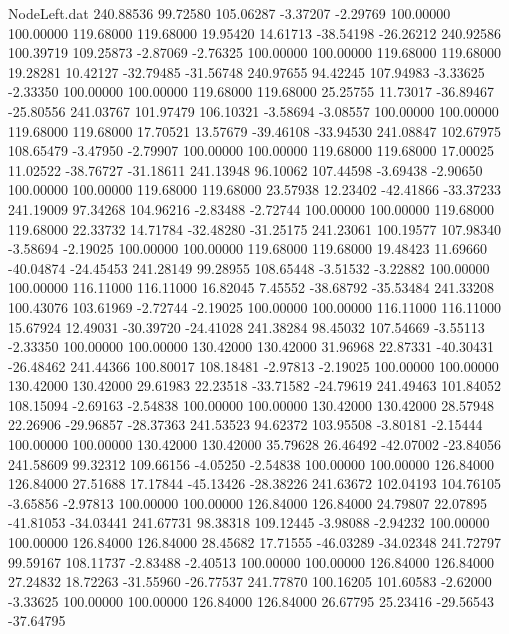 \begin{filecontents}{NodeLeft.dat}
 240.88536   99.72580  105.06287    -3.37207   -2.29769  100.00000  100.00000  119.68000  119.68000   19.95420   14.61713  -38.54198  -26.26212
 240.92586  100.39719  109.25873    -2.87069   -2.76325  100.00000  100.00000  119.68000  119.68000   19.28281   10.42127  -32.79485  -31.56748
 240.97655   94.42245  107.94983    -3.33625   -2.33350  100.00000  100.00000  119.68000  119.68000   25.25755   11.73017  -36.89467  -25.80556
 241.03767  101.97479  106.10321    -3.58694   -3.08557  100.00000  100.00000  119.68000  119.68000   17.70521   13.57679  -39.46108  -33.94530
 241.08847  102.67975  108.65479    -3.47950   -2.79907  100.00000  100.00000  119.68000  119.68000   17.00025   11.02522  -38.76727  -31.18611
 241.13948   96.10062  107.44598    -3.69438   -2.90650  100.00000  100.00000  119.68000  119.68000   23.57938   12.23402  -42.41866  -33.37233
 241.19009   97.34268  104.96216    -2.83488   -2.72744  100.00000  100.00000  119.68000  119.68000   22.33732   14.71784  -32.48280  -31.25175
 241.23061  100.19577  107.98340    -3.58694   -2.19025  100.00000  100.00000  119.68000  119.68000   19.48423   11.69660  -40.04874  -24.45453
 241.28149   99.28955  108.65448    -3.51532   -3.22882  100.00000  100.00000  116.11000  116.11000   16.82045    7.45552  -38.68792  -35.53484
 241.33208  100.43076  103.61969    -2.72744   -2.19025  100.00000  100.00000  116.11000  116.11000   15.67924   12.49031  -30.39720  -24.41028
 241.38284   98.45032  107.54669    -3.55113   -2.33350  100.00000  100.00000  130.42000  130.42000   31.96968   22.87331  -40.30431  -26.48462
 241.44366  100.80017  108.18481    -2.97813   -2.19025  100.00000  100.00000  130.42000  130.42000   29.61983   22.23518  -33.71582  -24.79619
 241.49463  101.84052  108.15094    -2.69163   -2.54838  100.00000  100.00000  130.42000  130.42000   28.57948   22.26906  -29.96857  -28.37363
 241.53523   94.62372  103.95508    -3.80181   -2.15444  100.00000  100.00000  130.42000  130.42000   35.79628   26.46492  -42.07002  -23.84056
 241.58609   99.32312  109.66156    -4.05250   -2.54838  100.00000  100.00000  126.84000  126.84000   27.51688   17.17844  -45.13426  -28.38226
 241.63672  102.04193  104.76105    -3.65856   -2.97813  100.00000  100.00000  126.84000  126.84000   24.79807   22.07895  -41.81053  -34.03441
 241.67731   98.38318  109.12445    -3.98088   -2.94232  100.00000  100.00000  126.84000  126.84000   28.45682   17.71555  -46.03289  -34.02348
 241.72797   99.59167  108.11737    -2.83488   -2.40513  100.00000  100.00000  126.84000  126.84000   27.24832   18.72263  -31.55960  -26.77537
 241.77870  100.16205  101.60583    -2.62000   -3.33625  100.00000  100.00000  126.84000  126.84000   26.67795   25.23416  -29.56543  -37.64795

\end{filecontents}
